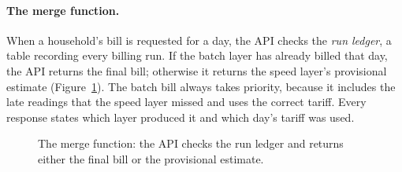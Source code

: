 \documentclass[11pt,a4paper]{article}
\begin{document}
\paragraph{The merge function.} When a household's bill is requested for a day, the API
checks the \emph{run ledger}, a table recording every billing run. If the batch layer has
already billed that day, the API returns the final bill; otherwise it returns the speed
layer's provisional estimate (Figure~\ref{fig:merge}). The batch bill always takes priority,
because it includes the late readings that the speed layer missed and uses the correct
tariff. Every response states which layer produced it and which day's tariff was used.

\begin{figure}[H]
\centering
{}
\caption{The merge function: the API checks the run ledger and returns either the final bill
or the provisional estimate.}
\label{fig:merge}
\end{figure}
\end{document}

